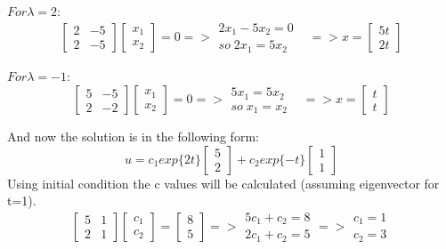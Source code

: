 \documentclass[eng,openany]{mgr}
\begin{document}
$For \lambda=2:$
\[
\begin{bmatrix}
2 & -5\\
2 & -5
\end{bmatrix}
\begin{bmatrix}
x_1\\
x_2
\end{bmatrix}
= 0 =>
\begin{matrix}
2x_1 - 5x_2 = 0&\\
so\; 2x_1 = 5x_2&
\end{matrix}
=> x =
\begin{bmatrix}
 5t\\
 2t
\end{bmatrix}
\]

$For \lambda=-1$:
\[
\begin{bmatrix}
5 & -5\\
2 & -2
\end{bmatrix}
\begin{bmatrix}
x_1\\
x_2
\end{bmatrix}
= 0 =>
\begin{matrix}
5x_1 = 5x_2&\\
so \; x_1 = x_2&
\end{matrix}
=> x =
\begin{bmatrix}
t\\
t
\end{bmatrix}
\]

And now the solution is in the following form:
\[
u = c_1 exp\{2t\}
\begin{bmatrix}
5\\
2
\end{bmatrix}
+ c_2 exp\{-t\}
\begin{bmatrix}
1\\
1
\end{bmatrix}
\]
Using initial condition the c values will be calculated (assuming eigenvector for t=1).
\[
\begin{bmatrix}
5 & 1\\
2 & 1
\end{bmatrix}
\begin{bmatrix}
c_1\\
c_2
\end{bmatrix}
=
\begin{bmatrix}
8\\5
\end{bmatrix}
=> 
\begin{matrix}
5c_1+c_2 = 8\\
2c_1+c_2 = 5
\end{matrix}
=>
\begin{matrix}
c_1 = 1\\
c_2 = 3
\end{matrix}
\]
\end{document}
